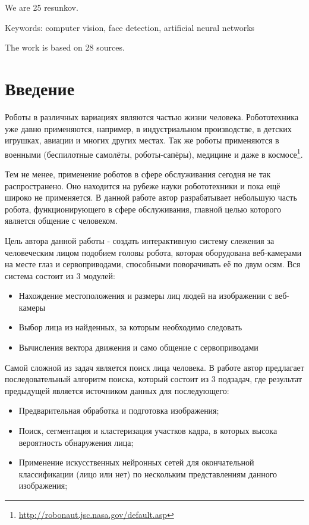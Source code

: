 \documentclass[12pt]{report}
\newenvironment{myItemize}{
 	\vspace{-10pt}
	\begin{itemize}[nolistsep]
}{\end{itemize}}
\begin{document}
We are 25 resunkov.

Keywords: computer vision, face detection, artificial neural networks

The work is based on 28 sources.



\chapter*{Введение}
\thispagestyle{fancy}

Роботы в различных вариациях являются частью жизни человека. Робототехника уже
давно применяются, например, в индустриальном производстве, в детских игрушках,
авиации и многих других местах. Так же роботы применяются в военными (беспилотные
самолёты, роботы-сапёры), медицине и даже в космосе\footnote{\url{http://robonaut.jsc.nasa.gov/default.asp}}.

Тем не менее, применение роботов в сфере обслуживания сегодня не так распространено. Оно находится на рубеже науки 
робототехники и пока ещё широко не применяется. В данной работе автор разрабатывает небольшую
часть робота, функционирующего в сфере обслуживания, главной целью которого
является общение с человеком. 

Цель автора данной работы - создать интерактивную систему слежения за человеческим лицом подобием головы робота, 
которая оборудована веб-камерами на месте глаз и сервоприводами, способными поворачивать её по двум осям. Вся 
система состоит из 3 модулей:
\begin{myItemize}
\item Нахождение местоположения и размеры лиц людей на изображении с веб-камеры
\item Выбор лица из найденных, за которым необходимо следовать
\item Вычисления вектора движения и само общение с сервоприводами
\end{myItemize}

Самой сложной из задач является поиск лица человека. В работе автор предлагает последовательный алгоритм поиска, 
который состоит из 3 подзадач, где результат предыдущей является источником данных для последующего:
\begin{myItemize}
\item Предварительная обработка и подготовка изображения;
\item Поиск, сегментация и кластеризация участков кадра, в которых высока вероятность обнаружения лица;
\item Применение искусственных нейронных сетей для окончательной классификации (лицо или нет) по нескольким 
представлениям данного изображения;
\end{myItemize}
\end{document}
